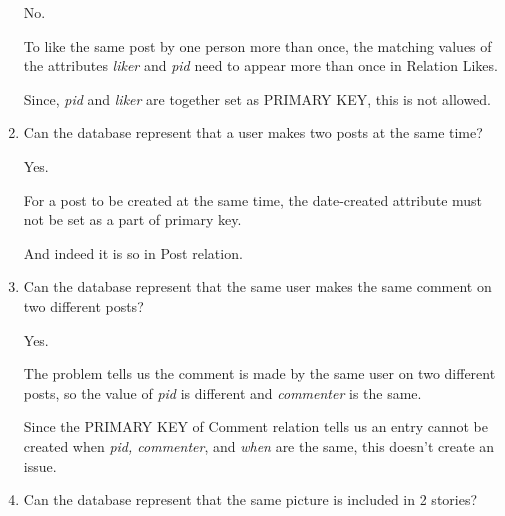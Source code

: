 \documentclass[12pt]{article}
\begin{document}
\begin{enumerate}[1.]
\begin{mdframed}
        No.

        \bigskip

        To like the same post by one person more than once, the matching values of
        the attributes \textit{liker} and \textit{pid} need to appear more than once in
        Relation Likes.

        \bigskip

        Since, \textit{pid} and \textit{liker} are together set as PRIMARY KEY, this
        is not allowed.

    \end{mdframed}

    \item Can the database represent that a user makes two posts at the same time?

    \bigskip

    \begin{mdframed}

    Yes.

    \bigskip

    For a post to be created at the same time, the date-created attribute must
    not be set as a part of primary key.

    \bigskip

    And indeed it is so in Post relation.

    \end{mdframed}

    \item  Can the database represent that the same user makes the same comment on
    two different posts?

    \bigskip

    \begin{mdframed}

    Yes.

    \bigskip

    The problem tells us the comment is made by the same user on two different posts,
    so the value of \textit{pid} is different and \textit{commenter} is the same.

    \bigskip

    Since the PRIMARY KEY of Comment relation tells us an entry cannot be created when
    \textit{pid, commenter}, and \textit{when} are the same, this doesn't create an issue.

    \bigskip

    \end{mdframed}

    \item Can the database represent that the same picture is included in 2 stories?


\end{enumerate}
\end{document}
